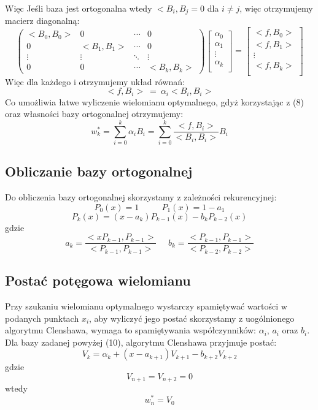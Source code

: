 \documentclass{article}
\begin{document}
Więc
Jeśli baza jest ortogonalna wtedy $<B_{i},B_{j} = 0$ dla $i \neq j$, więc otrzymujemy macierz diagonalną:
\begin{equation}
\begin{pmatrix}
  <B_{0},B_{0}> & 0 & \cdots & 0 \\
  0 & <B_{1},B_{1}> & \cdots & 0 \\
  \vdots  & \vdots  & \ddots & \vdots  \\
  0 & 0 & \cdots & <B_{k},B_{k}> 
 \end{pmatrix}
\begin{bmatrix}
    \alpha_{0} \\
    \alpha_{1} \\
    \vdots  \\
    \alpha_{k} \\
  \end{bmatrix} 
  =
  \begin{bmatrix}
    <f, B_{0}>  \\
    <f, B_{1}>  \\
    \vdots  \\
    <f, B_{k}>  \\
  \end{bmatrix} 
\end{equation}
Więc dla każdego i otrzymujemy układ równań:
\begin{equation}
<f, B_{i}> \ = \ \alpha_{i} < B_{i},B_{i}>
\end{equation}
Co umożliwia łatwe wyliczenie wielomianu optymalnego, gdyż korzystając z (8) oraz własności bazy ortogonalnej otrzymujemy:
\begin{equation}
w_{k}^{*} = \sum_{i=0}^{k} \alpha_{i}B_{i} = \sum_{i=0}^{k} \frac{<f,B_{i}>}{<B_{i},B_{i}>}B_{i}
\end{equation}
\subsection{Obliczanie bazy ortogonalnej}
Do obliczenia bazy ortogonalnej skorzystamy z zależności rekurencyjnej:
$$P_{0}(x) = 1 \ \ \ \ \ \ \ \ \ \ \ \ P_{1}(x) = 1 - a_{1}$$
\begin{equation}
P_{k}(x) = (x - a_{k}) P_{k-1}(x) - b_{k}P_{k-2}(x)
\end{equation}
gdzie
$$a_{k} = \frac{<xP_{k-1},P_{k-1}>}{<P_{k-1},P_{k-1}>} \ \ \ \ \ \ b_{k} = \frac{<P_{k-1},P_{k-1}>}{<P_{k-2},P_{k-2}>}$$
\newpage
\subsection{Postać potęgowa wielomianu}
Przy szukaniu wielomianu optymalnego wystarczy spamiętywać wartości w podanych punktach $x_{i}$, aby wyliczyć jego postać skorzystamy z uogólnionego algorytmu Clenshawa, wymaga to spamiętywania współczynników: $\alpha_{i}$, $a_{i}$ oraz $b_{i}$.\\
Dla bazy zadanej powyżej (10), algorytmu Clenshawa przyjmuje postać:
$$V_{k} = \alpha_{k} + (x - a_{k+1})V_{k+1} - b_{k+2}V_{k+2}$$
gdzie
$$V_{n+1} = V_{n+2} = 0$$
wtedy
$$w_{n}^{*} = V_{0}$$
\newpage
\end{document}
